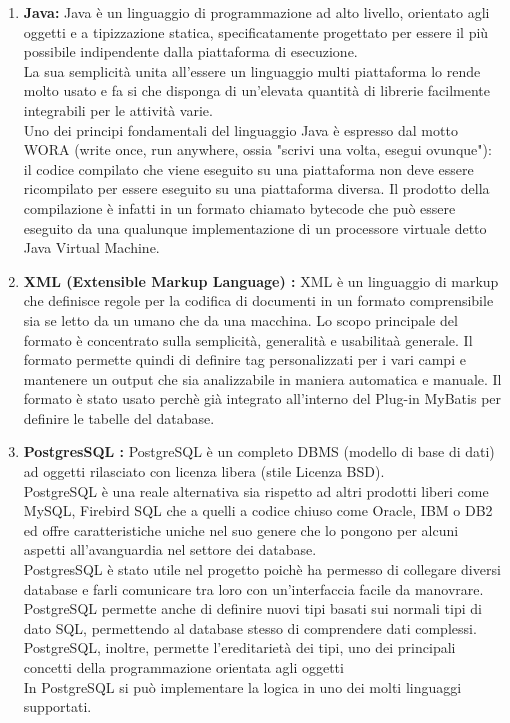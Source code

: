 \begin{enumerate}

\item \textbf{Java: }Java è un linguaggio di programmazione ad alto livello, orientato agli oggetti e a tipizzazione statica, specificatamente progettato per essere il più possibile indipendente dalla piattaforma di esecuzione.\\
La sua semplicità unita all'essere un linguaggio multi piattaforma lo rende molto usato e fa si che disponga di un'elevata quantità di librerie facilmente integrabili per le attività varie.\\
Uno dei principi fondamentali del linguaggio Java è espresso dal motto WORA (write once, run anywhere, ossia "scrivi una volta, esegui ovunque"): il codice compilato che viene eseguito su una piattaforma non deve essere ricompilato per essere eseguito su una piattaforma diversa. Il prodotto della compilazione è infatti in un formato chiamato bytecode che può essere eseguito da una qualunque implementazione di un processore virtuale detto Java Virtual Machine. 

\item \textbf{XML (Extensible Markup Language) : }XML è un linguaggio di markup che definisce regole per la codifica di documenti in un formato comprensibile sia se letto da un umano che da una macchina. Lo scopo principale del formato è concentrato sulla semplicità, generalità e usabilitaà generale. Il formato permette quindi di definire tag personalizzati per i vari campi e mantenere un output che sia analizzabile in maniera automatica e manuale.
Il formato è stato usato perchè già integrato all'interno del Plug-in MyBatis per definire le tabelle del database.

\item \textbf{PostgresSQL :}
PostgreSQL è un completo DBMS (modello di base di dati) ad oggetti rilasciato con licenza libera (stile Licenza BSD).\\
PostgreSQL è una reale alternativa sia rispetto ad altri prodotti liberi come MySQL, Firebird SQL che a quelli a codice chiuso come Oracle, IBM o DB2 ed offre caratteristiche uniche nel suo genere che lo pongono per alcuni aspetti all'avanguardia nel settore dei database.\\
PostgresSQL è stato utile nel progetto poichè ha permesso di collegare diversi database e farli comunicare tra loro con un’interfaccia facile da manovrare.
PostgreSQL permette anche di definire nuovi tipi basati sui normali tipi di dato SQL, permettendo al database stesso di comprendere dati complessi. \\
PostgreSQL, inoltre, permette l'ereditarietà dei tipi, uno dei principali concetti della programmazione orientata agli oggetti\\
In PostgreSQL si può implementare la logica in uno dei molti linguaggi supportati.


\end{enumerate}
